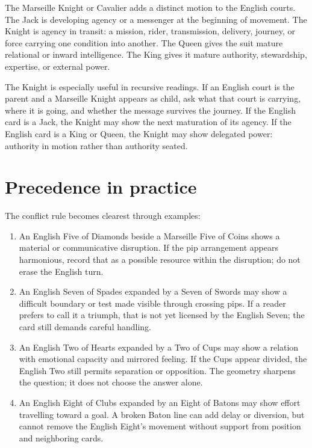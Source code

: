 The Marseille Knight or Cavalier adds a distinct motion to the English courts.
The Jack is developing agency or a messenger at the beginning of movement. The
Knight is agency in transit: a mission, rider, transmission, delivery, journey,
or force carrying one condition into another. The Queen gives the suit mature
relational or inward intelligence. The King gives it mature authority,
stewardship, expertise, or external power.

The Knight is especially useful in recursive readings. If an English court is
the parent and a Marseille Knight appears as child, ask what that court is
carrying, where it is going, and whether the message survives the journey. If
the English card is a Jack, the Knight may show the next maturation of its
agency. If the English card is a King or Queen, the Knight may show delegated
power: authority in motion rather than authority seated.

\section{Precedence in practice}

The conflict rule becomes clearest through examples:

\begin{enumerate}
\item An English Five of Diamonds beside a Marseille Five of Coins shows a
      material or communicative disruption. If the pip arrangement appears
      harmonious, record that as a possible resource within the disruption; do
      not erase the English turn.
\item An English Seven of Spades expanded by a Seven of Swords may show a
      difficult boundary or test made visible through crossing pips. If a reader
      prefers to call it a triumph, that is not yet licensed by the English
      Seven; the card still demands careful handling.
\item An English Two of Hearts expanded by a Two of Cups may show a relation
      with emotional capacity and mirrored feeling. If the Cups appear divided,
      the English Two still permits separation or opposition. The geometry
      sharpens the question; it does not choose the answer alone.
\item An English Eight of Clubs expanded by an Eight of Batons may show effort
      travelling toward a goal. A broken Baton line can add delay or diversion,
      but cannot remove the English Eight's movement without support from
      position and neighboring cards.
\end{enumerate}

